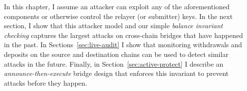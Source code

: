 





In this chapter, I assume an attacker can exploit any of the aforementioned
components or otherwise control the relayer (or submitter) keys.
In the next section, I show that this attacker model and our simple
\emph{balance invariant checking} captures the largest attacks on cross-chain
bridges that have happened in the past.  In Sections~\ref{sec:live-audit} I show
that monitoring withdrawals and deposits on the source and destination chains
can be used to detect similar attacks in the future.  Finally, in
Section~\ref{sec:active-protect} I describe an \emph{announce-then-execute} bridge
design that enforces this invariant to prevent attacks before they happen.


